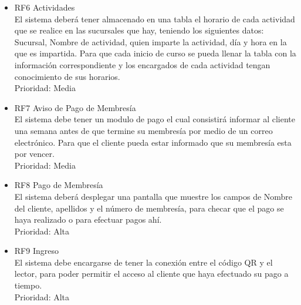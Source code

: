 \documentclass[12pt,letterpaper]{article}
\begin{document}
\begin{itemize}
	\item RF6 Actividades
	\\El sistema deberá tener almacenado en una tabla el horario de cada actividad que se realice en las sucursales que hay, teniendo los siguientes datos: Sucursal, Nombre de actividad, quien imparte la actividad, día y hora en la que es impartida. Para que cada inicio de curso se pueda llenar la tabla con la información correspondiente y los encargados de cada actividad tengan conocimiento de sus horarios. 
	\\Prioridad: Media
	
	\item RF7 Aviso de Pago de Membresía
	\\El sistema debe tener un modulo de pago el cual consistirá informar al cliente una semana antes de que termine su membresía por medio de un correo electrónico. Para que el cliente pueda estar informado que su membresía esta por vencer.
	\\Prioridad: Media
	
	\item RF8  Pago de Membresía
	\\El sistema deberá desplegar una pantalla que muestre los campos de Nombre del cliente, apellidos y el número de membresía, para checar que el pago se haya realizado o para efectuar pagos ahí.  
	\\Prioridad: Alta
	
	\item RF9 Ingreso
	\\El sistema debe encargarse de tener la conexión entre el código QR y el lector, para poder permitir el acceso al cliente que haya efectuado su pago a tiempo.
	\\Prioridad: Alta
	  

\end{itemize}
\end{document}
